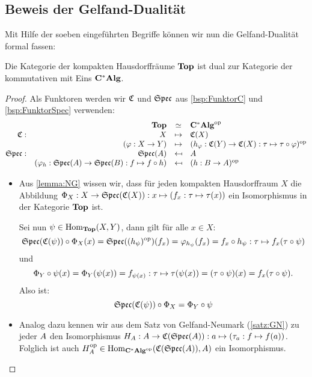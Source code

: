 

\subsection{Beweis der Gelfand-Dualität}

Mit Hilfe der soeben eingeführten Begriffe können wir nun die Gelfand-Dualität formal fassen:

\begin{satz}\label{satz:GD}
Die Kategorie der kompakten Hausdorffräume $\mathbf{Top}$ ist dual zur Kategorie der kommutativen \CAlgn{} mit Eins $\mathbf{C^*Alg}$.
\end{satz}


\begin{proof}Als Funktoren werden wir $\mathfrak{C}$ und $\mathfrak{Spec}$ aus \cref{bsp:FunktorC} und \ref{bsp:FunktorSpec} verwenden:
	\[\begin{array}{@{}rrcl@{}}
	 			&\KatTop			&\simeq		&\KatCAlg^\op 												\\
	\stetig: 	&X					&\mapsto	&\stetig(X)													\\
				&(\varphi:X \to Y)	&\mapsto	&(h_\varphi: \stetig(Y) \to \stetig(X): \tau \mapsto \tau \circ \varphi)^\op 		\\
	\SpecC:		&\SpecC(\A)													&\mapsfrom	&\A				\\
				&(\varphi_h: \SpecC(\A) \to \SpecC(\B): f \mapsto f \circ h)	&\mapsfrom	&(h: \B \to \A)^\op
	\end{array}\]

\begin{itemize}
	\item	
Aus \cref{lemma:NG} wissen wir, dass für jeden kompakten Hausdorffraum $X$ die Abbildung $\Phi_X: X \to \mathfrak{Spec}(\mathfrak{C}(X)): x \mapsto (f_x: \tau \mapsto \tau(x))$ ein Isomorphismus in der Kategorie $\mathbf{Top}$ ist.

Sei nun $\psi \in \mathrm{Hom}_{\mathbf{Top}}(X,Y)$, dann gilt für alle $x \in X$:
	\[\mathfrak{Spec}(\mathfrak{C}(\psi)) \circ \Phi_X(x) = \mathfrak{Spec}((h_\psi)^{\mathrm{op}})(f_x) = \varphi _{h_\psi}(f_x) = f_x \circ h_\psi: \tau \mapsto f_x(\tau \circ \psi)\]
und
 	\[\Phi_Y \circ \psi(x) = \Phi_Y(\psi(x)) = f_{\psi(x)}: \tau \mapsto \tau(\psi(x)) = (\tau \circ \psi)(x) = f_x(\tau \circ \psi).\]
Also ist: 
	\[\mathfrak{Spec}(\mathfrak{C}(\psi)) \circ \Phi_X = \Phi_Y \circ \psi\]


\item
Analog dazu kennen wir aus dem Satz von Gelfand-Neumark (\cref{satz:GN}) zu jeder \CAlg{} $A$ den Isomorphismus $H_A: A \to \mathfrak{C}(\mathfrak{Spec}(A)): a \mapsto (\tau_a: f \mapsto f(a))$. Folglich ist auch $H_A^{\mathrm{op}} \in \mathrm{Hom}_{\mathbf{C^*Alg}^{\mathrm{op}}}(\mathfrak{C}(\mathfrak{Spec}(A)),A)$ ein Isomorphismus. 


\end{itemize}
\end{proof}
